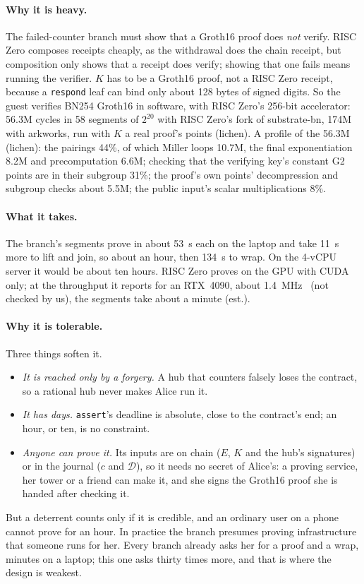 \documentclass[11pt]{article}
\newcommand{\tx}[1]{\texttt{#1}}
\begin{document}
\paragraph{Why it is heavy.} The failed-counter branch must show that a
Groth16 proof does \emph{not} verify. RISC Zero composes receipts
cheaply, as the withdrawal does the chain receipt, but composition only
shows that a receipt does verify; showing that one fails means running
the verifier. $K$ has to be a Groth16 proof, not a RISC Zero receipt,
because a \tx{respond} leaf can bind only about 128 bytes of signed
digits. So the guest verifies BN254 Groth16 in software, with RISC
Zero's 256-bit accelerator: 56.3M cycles in 58 segments of $2^{20}$ with
RISC Zero's fork of substrate-bn, 174M with arkworks, run with $K$ a real
proof's points (lichen). A profile of the 56.3M (lichen): the pairings
44\%, of which Miller loops 10.7M, the final exponentiation 8.2M and
precomputation 6.6M; checking that the verifying key's constant G2
points are in their subgroup 31\%; the proof's own points' decompression
and subgroup checks about 5.5M; the public input's scalar
multiplications 8\%.

\paragraph{What it takes.} The branch's segments prove in about 53~s
each on the laptop and take 11~s more to lift and join, so about an hour,
then 134~s to wrap. On the 4-vCPU server it would be about ten hours.
RISC Zero proves on the GPU with CUDA only; at the throughput it reports
for an RTX~4090, about 1.4~MHz~\cite{risc0bench} (not checked by us), the
segments take about a minute (est.).

\paragraph{Why it is tolerable.} Three things soften it.
\begin{itemize}[leftmargin=1.5em]
\item \emph{It is reached only by a forgery.} A hub that counters falsely
  loses the contract, so a rational hub never makes Alice run it.
\item \emph{It has days.} \tx{assert}'s deadline is absolute, close to
  the contract's end; an hour, or ten, is no constraint.
\item \emph{Anyone can prove it.} Its inputs are on chain ($E$, $K$ and
  the hub's signatures) or in the journal ($c$ and $\mathcal{D}$), so it
  needs no secret of Alice's: a proving service, her tower or a friend
  can make it, and she signs the Groth16 proof she is handed after
  checking it.
\end{itemize}
But a deterrent counts only if it is credible, and an ordinary user on a
phone cannot prove for an hour. In practice the branch presumes proving
infrastructure that someone runs for her. Every branch already asks
her for a proof and a wrap, minutes on a laptop; this one asks thirty
times more, and that is where the design is weakest.
\end{document}
